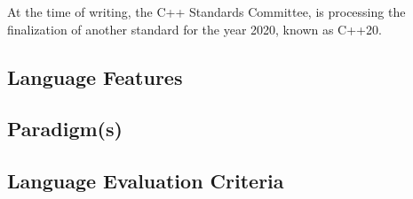 \documentclass[12pt]{article}
\begin{document}
At the time of writing, the C++ Standards Committee, is processing the finalization of another standard for the year 2020, known as C++20.

\subsection{Language Features}
\subsection{Paradigm(s)}

\subsection{Language Evaluation Criteria}

\iffalse



%
%
%
\subsubsection{Data Types}
\subsubsection{Binding, Scoping, Referencing}
\subsubsection{Expressions}
\subsubsection{Statements and Control Structures}
\subsubsection{Procedures and Subprograms}
\fi
\end{document}
